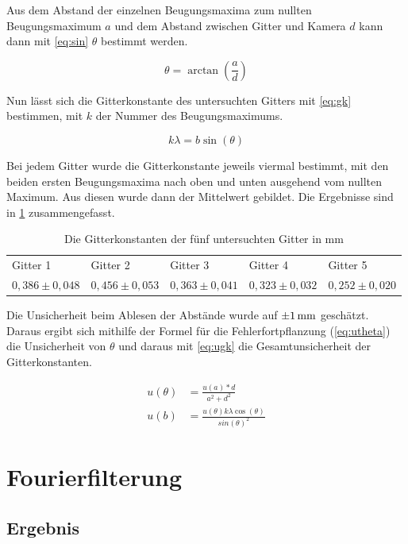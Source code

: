 Aus dem Abstand der einzelnen Beugungsmaxima zum nullten Beugungsmaximum $a$ und dem Abstand zwischen Gitter und Kamera $d$ kann dann mit \cref{eq:sin} $\theta$ bestimmt werden.

\begin{equation}
	\theta = \arctan\left(\frac{a}{d}\right)
	\label{eq:sin}
\end{equation}

Nun lässt sich die Gitterkonstante des untersuchten Gitters mit \cref{eq:gk} bestimmen, mit $k$ der Nummer des Beugungsmaximums.

\begin{equation}
	k\lambda = b \sin(\theta)
	\label{eq:gk}
\end{equation}

Bei jedem Gitter wurde die Gitterkonstante jeweils viermal bestimmt, mit den beiden ersten Beugungsmaxima nach oben und unten ausgehend vom nullten Maximum. Aus diesen wurde dann der Mittelwert gebildet. Die Ergebnisse sind in \cref{tab} zusammengefasst.

\begin{table}[h]
	\caption{Die Gitterkonstanten der fünf untersuchten Gitter in mm}
\begin{tabular}{lllll}
	Gitter 1 & Gitter 2& Gitter 3& Gitter 4& Gitter 5\\
	 $0,386\pm0,048$ & $0,456\pm0,053$ & $0,363\pm0,041$ & $0,323\pm0,032$ & $0,252\pm0,020$
\end{tabular}
\label{tab}
\end{table}

Die Unsicherheit beim Ablesen der Abstände wurde auf $\SI{\pm1}{mm}$ geschätzt. Daraus ergibt sich mithilfe der Formel für die Fehlerfortpflanzung (\cref{eq:utheta}) die Unsicherheit von $\theta$ und daraus mit \cref{eq:ugk} die Gesamtunsicherheit der Gitterkonstanten.

\begin{align}
u(\theta) &= \frac{u(a)*d}{a^2 +d^2}
\label{eq:utheta}\\
u(b) &= \frac{u(\theta) k \lambda \cos(\theta)}{sin(\theta)^2}
\label{eq:ugk}
\end{align}

\section{Fourierfilterung}
\subsection{Ergebnis}
